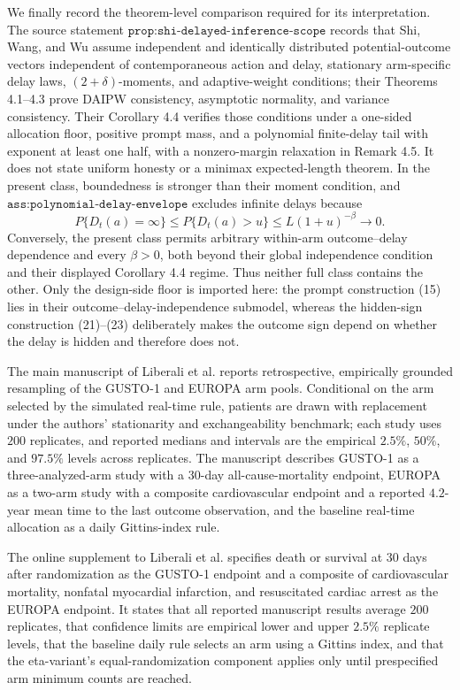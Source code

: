 We finally record the theorem-level comparison required for its interpretation.  The source statement \(\texttt{prop:shi-delayed-inference-scope}\) records that Shi, Wang, and Wu \cite{ShiWangWu2023DelayedInference} assume independent and identically distributed potential-outcome vectors independent of contemporaneous action and delay, stationary arm-specific delay laws, \((2+\delta)\)-moments, and adaptive-weight conditions; their Theorems 4.1--4.3 prove DAIPW consistency, asymptotic normality, and variance consistency.  Their Corollary 4.4 verifies those conditions under a one-sided allocation floor, positive prompt mass, and a polynomial finite-delay tail with exponent at least one half, with a nonzero-margin relaxation in Remark 4.5.  It does not state uniform honesty or a minimax expected-length theorem.  In the present class, boundedness is stronger than their moment condition, and \(\texttt{ass:polynomial-delay-envelope}\) excludes infinite delays because
\[
 P\{D_t(a)=\infty\}
 \leq P\{D_t(a)>u\}
 \leq L(1+u)^{-\beta}\longrightarrow0.
 \tag{27}
\]
Conversely, the present class permits arbitrary within-arm outcome--delay dependence and every \(\beta>0\), both beyond their global independence condition and their displayed Corollary 4.4 regime.  Thus neither full class contains the other.  Only the design-side floor is imported here: the prompt construction (15) lies in their outcome--delay-independence submodel, whereas the hidden-sign construction (21)--(23) deliberately makes the outcome sign depend on whether the delay is hidden and therefore does not.

The main manuscript of Liberali et al. reports retrospective, empirically grounded resampling of the GUSTO-1 and EUROPA arm pools.  Conditional on the arm selected by the simulated real-time rule, patients are drawn with replacement under the authors' stationarity and exchangeability benchmark; each study uses \(200\) replicates, and reported medians and intervals are the empirical \(2.5\%\), \(50\%\), and \(97.5\%\) levels across replicates.  The manuscript describes GUSTO-1 as a three-analyzed-arm study with a \(30\)-day all-cause-mortality endpoint, EUROPA as a two-arm study with a composite cardiovascular endpoint and a reported \(4.2\)-year mean time to the last outcome observation, and the baseline real-time allocation as a daily Gittins-index rule.

The online supplement to Liberali et al. specifies death or survival at \(30\) days after randomization as the GUSTO-1 endpoint and a composite of cardiovascular mortality, nonfatal myocardial infarction, and resuscitated cardiac arrest as the EUROPA endpoint.  It states that all reported manuscript results average \(200\) replicates, that confidence limits are empirical lower and upper \(2.5\%\) replicate levels, that the baseline daily rule selects an arm using a Gittins index, and that the eta-variant's equal-randomization component applies only until prespecified arm minimum counts are reached.

